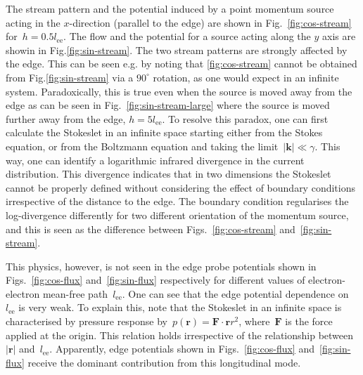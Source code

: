 \documentclass[preprint,aps,eqsecnum, prb]{revtex4-1}
\begin{document}
The stream pattern and the potential induced by a point momentum
source acting in the $x$-direction (parallel to the edge)
are shown in Fig.~\ref{fig:cos-stream}
for~$h = 0.5l_\mathrm{ee}$. The flow and the potential for a source acting
along the $y$ axis are showin in Fig.\ref{fig:sin-stream}.
The two stream patterns are strongly affected by the edge.
This can be seen e.g. by noting that \ref{fig:cos-stream}
cannot be obtained from Fig.\ref{fig:sin-stream} via a $90^\circ$
rotation, as one would expect in an infinite system.
Paradoxically, this is true even when the source is moved away from the edge
as can be seen in Fig.~\ref{fig:sin-stream-large} where the source
is moved further away from the edge, $h = 5l_\mathrm{ee}$.
To resolve this paradox, one can first calculate the Stokeslet in an infinite
space starting either from the Stokes equation, or from the Boltzmann
equation and taking the limit~$|{\bm k}| \ll \gamma$. This way, one can
identify a logarithmic infrared divergence in the current distribution.
This divergence indicates that in two dimensions the Stokeslet cannot
be properly defined without considering the effect of boundary conditions
irrespective of the distance to the edge. The boundary condition regularises
the log-divergence differently for two different orientation of the momentum
source, and this is seen as the difference between
Figs.~\ref{fig:cos-stream} and~\ref{fig:sin-stream}.

This physics, however, is not seen  in the
edge probe potentials
shown in Figs.~\ref{fig:cos-flux} and~\ref{fig:sin-flux}
respectively for different values of electron-electron
mean-free path~$l_\mathrm{ee}$.
One can see that the edge potential dependence on~$l_\mathrm{ee}$ is
very weak.
To explain this, note that the Stokeslet in an infinite space is
characterised by pressure  response
by~$p({\bm r}) = {\bm F} \cdot{\bm r}{r^2}$, where~${\bm F}$ is the
force applied at the origin. This relation holds irrespective
of the relationship between~$|{\bm r}|$ and~$l_\mathrm{ee}$.
Apparently, edge potentials shown in  Figs.~\ref{fig:cos-flux}
and~\ref{fig:sin-flux} receive the dominant contribution from this
longitudinal mode.
\end{document}
